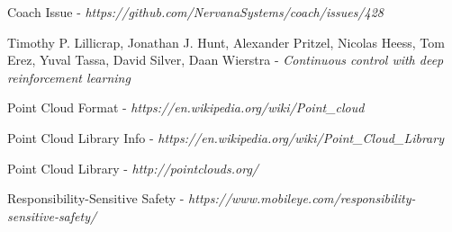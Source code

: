 \begin{thebibliography}{9}
Coach Issue - \textit{https://github.com/NervanaSystems/coach/issues/428}

Timothy P. Lillicrap, Jonathan J. Hunt, Alexander Pritzel, Nicolas Heess, Tom Erez, Yuval Tassa, David Silver, Daan Wierstra - \textit{Continuous control with deep reinforcement learning}

Point Cloud Format - \textit{https://en.wikipedia.org/wiki/Point\_cloud}

Point Cloud Library Info - \textit{https://en.wikipedia.org/wiki/Point\_Cloud\_Library}

Point Cloud Library - \textit{http://pointclouds.org/}

Responsibility-Sensitive Safety - \textit{https://www.mobileye.com/responsibility-sensitive-safety/}

\end{thebibliography}